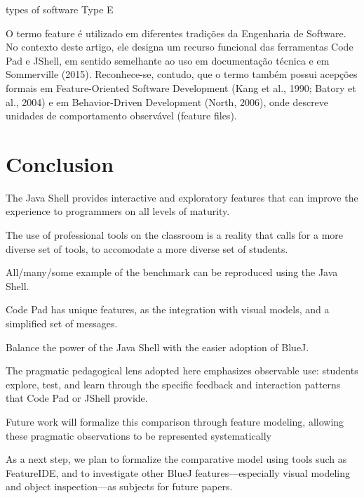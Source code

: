 \documentclass{article}
\begin{document}
types of software 
Type E

O termo feature é utilizado em diferentes tradições da Engenharia de Software. No contexto deste artigo, ele designa um recurso funcional das ferramentas Code Pad e JShell, em sentido semelhante ao uso em documentação técnica e em Sommerville (2015).
Reconhece-se, contudo, que o termo também possui acepções formais em Feature-Oriented Software Development (Kang et al., 1990; Batory et al., 2004) e em Behavior-Driven Development (North, 2006), onde descreve unidades de comportamento observável (feature files).

\section{Conclusion}

The Java Shell provides interactive and exploratory features that can improve the experience to programmers on all levels of maturity.

The use of professional tools on the classroom is a reality that calls for a more diverse set of tools, to accomodate a more diverse set of students.

All/many/some example of the benchmark can be reproduced using the Java Shell.

Code Pad has unique features, as the integration with visual models, and a simplified set of messages. 

Balance the power of the Java Shell with the easier adoption of BlueJ.

The pragmatic pedagogical lens adopted here emphasizes observable use: students explore, test, and learn through the specific feedback and interaction patterns that Code Pad or JShell provide.

Future work will formalize this comparison through feature modeling, allowing these pragmatic observations to be represented systematically

As a next step, we plan to formalize the comparative model using tools such as FeatureIDE, and to investigate other BlueJ features—especially visual modeling and object inspection—as subjects for future papers.



\end{document}
